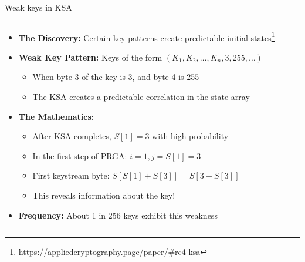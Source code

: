 \documentclass[aspectratio=169, lualatex, handout]{beamer}
\begin{document}
\begin{frame}{Weak keys in KSA}
	\begin{columns}[c]
		\begin{column}{1\textwidth}
			\begin{itemize}[<+->]
				\item \textbf{The Discovery:} Certain key patterns create predictable initial states\footnote{\url{https://appliedcryptography.page/paper/\#rc4-ksa}}
				\item \textbf{Weak Key Pattern:} Keys of the form $(K_1, K_2, \ldots, K_n, 3, 255, \ldots)$
				      \begin{itemize}[<+->]
					      \item When byte 3 of the key is 3, and byte 4 is 255
					      \item The KSA creates a predictable correlation in the state array
				      \end{itemize}
				\item \textbf{The Mathematics:}
				      \begin{itemize}[<+->]
					      \item After KSA completes, $S[1] = 3$ with high probability
					      \item In the first step of PRGA: $i = 1, j = S[1] = 3$
					      \item First keystream byte: $S[S[1] + S[3]] = S[3 + S[3]]$
					      \item This reveals information about the key!
				      \end{itemize}
				\item \textbf{Frequency:} About 1 in 256 keys exhibit this weakness
			\end{itemize}
		\end{column}
	\end{columns}
\end{frame}
\end{document}
